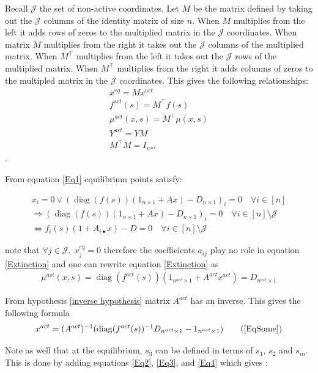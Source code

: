 \documentclass[3p,times]{article}
\DeclareMathOperator{\diag}{diag}
\begin{document}
Recall $\mathcal{J}$ the set of non-active coordinates. Let $M$ be the matrix defined by taking out the $\mathcal{J}$ columns of the identity matrix of size $n$. When $M$ multiplies from the left it adds rows of zeros to the multiplied matrix in the $\mathcal{J}$ coordinates. When matrix $M$ multiplies from the right it takes out the $\mathcal{J}$ columns of the multiplied matrix. When $M^\top$ multiplies from the left it takes out the $\mathcal{J}$ rows of the multiplied matrix. When $M^{\top}$ multiplies from the right it adds columns of zeros to the multipled matrix in the $\mathcal{J}$ coordinates. This gives the following relationships:
	\begin{align}
	x^{eq} = Mx^{act} \\	
	f^{act}(s) = M^{\top}f(s) \\
	\mu^{act}(x,s) = M^{\top}\mu(x,s)\\
	Y^{act} = YM \\
	M^\top M = I_{n^{act}}
	\end{align}.   

From equation \eqref{Eq1} equilibrium points satisfy: 

\begin{align}
x_i = 0 \vee (\diag(f(s))(1_{n\times 1} + Ax) - D_{n\times 1})_i = 0 \quad \forall i \in [n] \\
\Rightarrow  (\diag (f(s))(1_{n\times 1}+ Ax) - D_{n\times 1})_i = 0 \quad \forall i \in [n]\setminus \mathcal{J} \\
\Leftrightarrow f_i(s)(1 + A_{i\bullet}x) - D = 0 \quad \forall i \in [n]\setminus \mathcal{J} \label{Extinction}
\end{align} 

note that $\forall j \in \mathcal{J}, \; x^{eq}_j = 0 $ therefore the coefficients $a_{ij}$ play no role in equation \eqref{Extinction} and one can rewrite equation \eqref{Extinction} as 
\begin{align} 
\label{mu=D}\mu^{act}(x,s) = \diag(f^{act}(s))(1_{n^{act}\times 1} + A^{act}x^{act}) = D_{n^{act} \times 1} 
\end{align}

From hypothesis \ref{inverse hypothesis} matrix $A^{act}$ has an inverse. This gives the following formula
	\begin{align}
	x^{act} = (A^{act})^{-1}(\diag(f^{act}(s))^{-1}D_{n^{act}\times 1} - 1_{n^{act}\times 1}) \tag{\ref{EqSome}}
	\end{align} 



Note as well that at the equilibrium, $s_3$ can be defined in terms of $s_1$, $s_2$ and $s_{in}$. This is done by adding equations \eqref{Eq2}, \eqref{Eq3},  and \eqref{Eq4} which gives :
\end{document}
